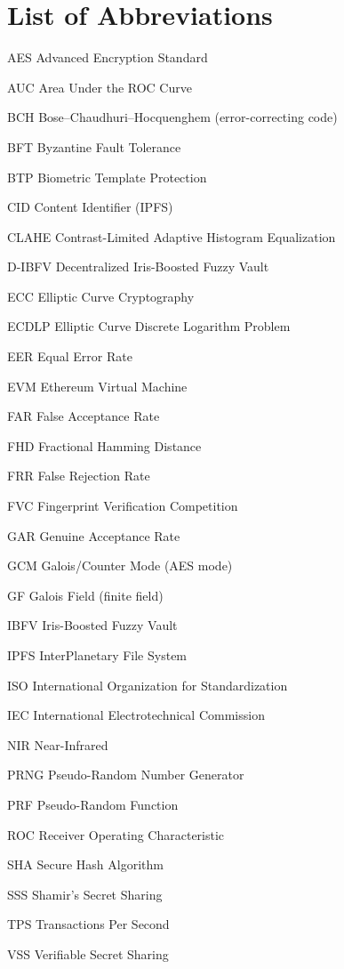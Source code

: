 \chapter*{List of Abbreviations}

\begin{abbrv}
    \item[AES]          Advanced Encryption Standard
    \item[AUC]          Area Under the ROC Curve
    \item[BCH]          Bose–Chaudhuri–Hocquenghem (error-correcting code)
    \item[BFT]          Byzantine Fault Tolerance
    \item[BTP]          Biometric Template Protection
    \item[CID]          Content Identifier (IPFS)
    \item[CLAHE]        Contrast-Limited Adaptive Histogram Equalization
    \item[D-IBFV]       Decentralized Iris-Boosted Fuzzy Vault
    \item[ECC]          Elliptic Curve Cryptography
    \item[ECDLP]        Elliptic Curve Discrete Logarithm Problem
    \item[EER]          Equal Error Rate
    \item[EVM]          Ethereum Virtual Machine
    \item[FAR]          False Acceptance Rate
    \item[FHD]          Fractional Hamming Distance
    \item[FRR]          False Rejection Rate
    \item[FVC]          Fingerprint Verification Competition
    \item[GAR]          Genuine Acceptance Rate
    \item[GCM]          Galois/Counter Mode (AES mode)
    \item[GF]           Galois Field (finite field)
    \item[IBFV]         Iris-Boosted Fuzzy Vault
    \item[IPFS]         InterPlanetary File System
    \item[ISO]          International Organization for Standardization
    \item[IEC]          International Electrotechnical Commission
    \item[NIR]          Near-Infrared
    \item[PRNG]         Pseudo-Random Number Generator
    \item[PRF]          Pseudo-Random Function
    \item[ROC]          Receiver Operating Characteristic
    \item[SHA]          Secure Hash Algorithm
    \item[SSS]          Shamir's Secret Sharing
    \item[TPS]          Transactions Per Second
    \item[VSS]          Verifiable Secret Sharing


\end{abbrv}
